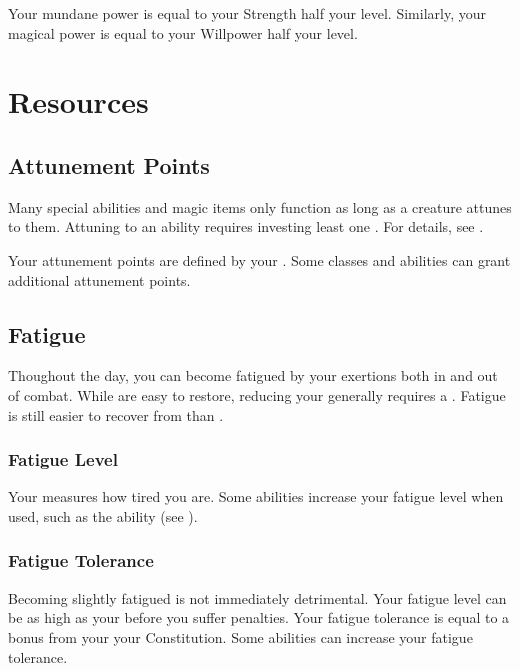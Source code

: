     Your mundane power is equal to your Strength \add half your level.
    Similarly, your magical power is equal to your Willpower \add half your level.

\section{Resources}\label{Resources}

  \subsection{Attunement Points}\label{Attunement Points}
    Many special abilities and magic items only function as long as a creature attunes to them.
    Attuning to an ability requires investing least one .
    For details, see .

    Your attunement points are defined by your .
    Some classes and abilities can grant additional attunement points.

  \subsection{Fatigue}\label{Fatigue}
    Thoughout the day, you can become fatigued by your exertions both in and out of combat.
    While  are easy to restore, reducing your  generally requires a .
    Fatigue is still easier to recover from than .

    \subsubsection{Fatigue Level}\label{Fatigue Level}
      Your  measures how tired you are.
      Some abilities increase your fatigue level when used, such as the  ability (see ).

    \subsubsection{Fatigue Tolerance}\label{Fatigue Tolerance}
      Becoming slightly fatigued is not immediately detrimental.
      Your fatigue level can be as high as your  before you suffer penalties.
      Your fatigue tolerance is equal to a bonus from your  \add your Constitution.
      Some abilities can increase your fatigue tolerance.

